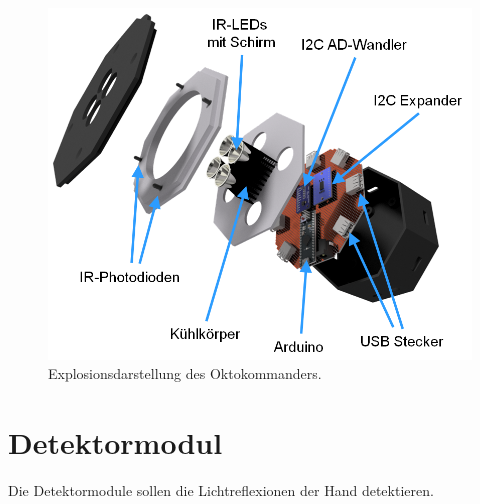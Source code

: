 \documentclass{sciposter}
\begin{document}
\begin{multicols}{3}
\begin{figure}[h]
	\centering
	\includegraphics[scale=1.25]{../CAD_Bilder/Oktokommander/Oktokommander_beschriftet.png}
	\caption{Explosionsdarstellung des Oktokommanders.}
	\label{fig:Oktokommander}
\end{figure}


\section{Detektormodul}
\noindent
Die Detektormodule sollen die Lichtreflexionen der Hand detektieren. %


\end{multicols}
\end{document}
